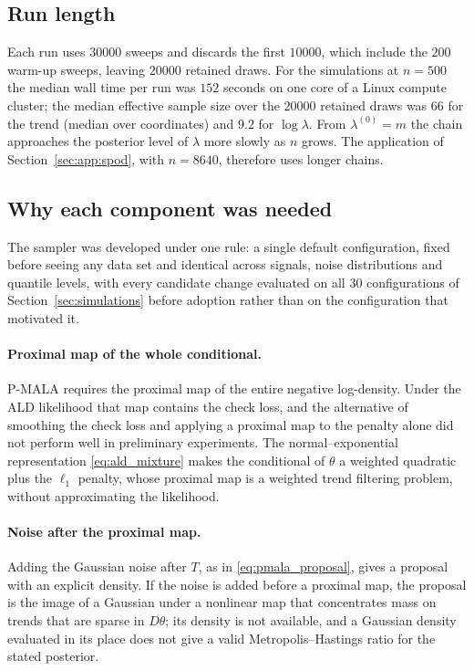 \subsection{Run length}
\label{app:pmala:runlength}

Each run uses $30000$ sweeps and discards the first $10000$, which include the $200$ warm-up sweeps, leaving $20000$ retained draws. For the simulations at $n = 500$ the median wall time per run was $152$ seconds on one core of a Linux compute cluster; the median effective sample size over the $20000$ retained draws was $66$ for the trend (median over coordinates) and $9.2$ for $\log\lambda$. From $\lambda^{(0)} = m$ the chain approaches the posterior level of $\lambda$ more slowly as $n$ grows. The application of Section~\ref{sec:app:spod}, with $n = 8640$, therefore uses longer chains.

\subsection{Why each component was needed}
\label{app:pmala:changes}

The sampler was developed under one rule: a single default configuration, fixed before seeing any data set and identical across signals, noise distributions and quantile levels, with every candidate change evaluated on all $30$ configurations of Section~\ref{sec:simulations} before adoption rather than on the configuration that motivated it.

\paragraph{Proximal map of the whole conditional.} P-MALA requires the proximal map of the entire negative log-density. Under the ALD likelihood that map contains the check loss, and the alternative of smoothing the check loss and applying a proximal map to the penalty alone did not perform well in preliminary experiments. The normal--exponential representation \eqref{eq:ald_mixture} makes the conditional of $\theta$ a weighted quadratic plus the $\ell_1$ penalty, whose proximal map is a weighted trend filtering problem, without approximating the likelihood.

\paragraph{Noise after the proximal map.} Adding the Gaussian noise after $T$, as in \eqref{eq:pmala_proposal}, gives a proposal with an explicit density. If the noise is added before a proximal map, the proposal is the image of a Gaussian under a nonlinear map that concentrates mass on trends that are sparse in $D\theta$; its density is not available, and a Gaussian density evaluated in its place does not give a valid Metropolis--Hastings ratio for the stated posterior.

